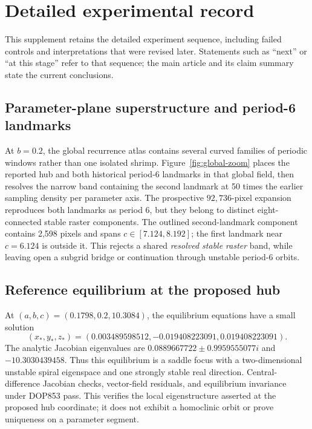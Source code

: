 \section{Detailed experimental record}
\label{supp:experiments}

This supplement retains the detailed experiment sequence, including failed
controls and interpretations that were revised later.  Statements such as
``next'' or ``at this stage'' refer to that sequence; the main article and
its claim summary state the current conclusions.


\subsection{Parameter-plane superstructure and period-6 landmarks}

At $b=0.2$, the global recurrence atlas contains several curved families of
periodic windows rather than one isolated shrimp.  Figure~\ref{fig:global-zoom}
places the reported hub and both historical period-6 landmarks in that global
field, then resolves the narrow band containing the second landmark at 50
times the earlier sampling density per parameter axis.  The prospective
$92{,}736$-pixel expansion reproduces both landmarks as period 6, but they
belong to distinct eight-connected stable raster components.  The outlined
second-landmark component contains 2,598 pixels and spans
$c\in[7.124,8.192]$; the first landmark near $c=6.124$ is outside it.  This
rejects a shared \emph{resolved stable raster} band, while leaving open a
subgrid bridge or continuation through unstable period-6 orbits.



\subsection{Reference equilibrium at the proposed hub}

At $(a,b,c)=(0.1798,0.2,10.3084)$, the equilibrium equations have a small
solution
\[
(x_*,y_*,z_*)=(0.003489598512,-0.019408223091,0.019408223091).
\]
The analytic Jacobian eigenvalues are
$0.0889667722\pm0.9959555077i$ and $-10.3030439458$.  Thus this equilibrium is
a saddle focus with a two-dimensional unstable spiral eigenspace and one
strongly stable real direction.  Central-difference Jacobian checks,
vector-field residuals, and equilibrium invariance under DOP853 pass.  This
verifies the local eigenstructure asserted at the proposed hub coordinate; it
does not exhibit a homoclinic orbit or prove uniqueness on a parameter segment.

